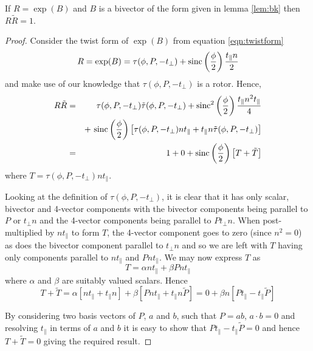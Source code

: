 \begin{thm} If $R = \exp(B)$ and $B$ is a bivector of the form 
given in lemma
\ref{lem:bk} then $R\tilde{R} = 1$.
\end{thm}
\begin{proof}
Consider the twist form of $\exp(B)$ from equation \ref{eqn:twistform}
\[
R = \exp(B) =
\tau(\phi, P, - t_\perp) + \mathrm{sinc}\left(\frac{\phi}{2}\right)\frac{t_\parallel n}{2}
\]
and make use of our knowledge that $\tau(\phi, P, - t_\perp)$ is a rotor.
Hence,
\begin{eqnarray*}
R\tilde{R} & = & \tau(\phi, P, - t_\perp)\tilde{\tau}(\phi, P, - t_\perp)
+ \mathrm{sinc}^2\left(\frac{\phi}{2}\right)
\frac{t_\parallel n^2 t_\parallel}{4}\\
&& + \ \mathrm{sinc}\left(\frac{\phi}{2}\right)
\left[ \tau(\phi, P, - t_\perp)nt_\parallel + 
       t_\parallel n\tilde{\tau}(\phi, P, - t_\perp) \right] \\
& = & 1 + 0 + \mathrm{sinc}\left(\frac{\phi}{2}\right)
\left[ T + \tilde{T} \right]
\end{eqnarray*}
where $T = \tau(\phi, P, - t_\perp)nt_\parallel$.

Looking at the definition of $\tau(\phi, P, - t_\perp)$, it is clear
that it has only scalar, bivector and 4-vector components with
the bivector components being parallel to $P$ or $t_\perp n$ and
the 4-vector components being parallel to $Pt_\perp n$. When
post-multiplied by $nt_\parallel$ to form $T$, the 4-vector component
goes to zero (since $n^2 = 0$) as does the bivector component
parallel to $t_\perp n$ and so we are left with $T$ having only
components parallel to $nt_\parallel$ and $Pnt_\parallel$. 
We may now express $T$ as
\[
T = \alpha nt_\parallel + \beta Pnt_\parallel
\]
where $\alpha$ and $\beta$ are suitably valued scalars. Hence
\[
T + \tilde{T} = \alpha \left[ nt_\parallel + t_\parallel n \right]
+ \beta \left[ Pnt_\parallel + t_\parallel n\tilde{P} \right] 
= 0 + \beta n \left[ Pt_\parallel - t_\parallel \tilde{P} \right]
\]

By considering two basis vectors of $P$, $a$ and $b$, such
that $P = ab$, $a \cdot b = 0$ and resolving $t_\parallel$ in 
terms of $a$ and $b$ it is easy to show that 
$Pt_\parallel - t_\parallel\tilde{P} = 0$ and hence
$T + \tilde{T} = 0$ giving the required result.
\end{proof}

